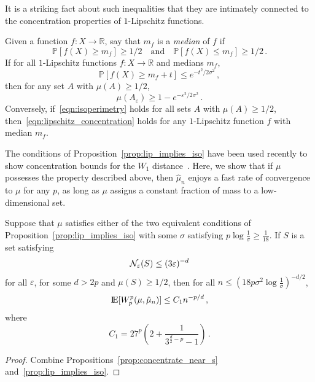 \documentclass[sts]{imsart}
\newcommand{\RR}{\mathbb{R}}
\newcommand{\p}{\mathbb{P}}
\newcommand*{\ep}{\varepsilon}
\begin{document}
It is a striking fact about such inequalities that they are intimately connected to the concentration properties of $1$-Lipschitz functions.
\begin{proposition}\label{prop:lip_implies_iso}
Given a function $f:X \to \RR$, say that $m_f$ is a \emph{median} of $f$ if
\begin{equation*}
\p[f(X) \geq m_f] \geq 1/2 \quad \text{and} \quad \p[f(X) \leq m_f] \geq 1/2\,.
\end{equation*}
If for all $1$-Lipschitz functions $f: X \to \RR$ and medians $m_f$,
\begin{equation}\label{eqn:lipschitz_concentration}
\p[f(X) \geq m_f + t] \leq e^{-t^2/2\sigma^2}\,,
\end{equation}
then for any set $A$ with $\mu(A) \geq 1/2$,
\begin{equation}\label{eqn:isoperimetry}
\mu(A_\ep) \geq 1 - e^{-\ep^2/2 \sigma^2}\,.
\end{equation}
Conversely, if~\eqref{eqn:isoperimetry} holds for all sets $A$ with $\mu(A) \geq 1/2$, then~\eqref{eqn:lipschitz_concentration} holds for any $1$-Lipschitz function $f$ with median $m_f$.
\end{proposition}

The conditions of Proposition~\ref{prop:lip_implies_iso} have been used recently to show concentration bounds for the $W_1$ distance~\cite{BolGuiVil07}.
Here, we show that if $\mu$ possesses the property described above, then $\hat \mu_n$ enjoys a fast rate of convergence to $\mu$ for any $p$, as long as $\mu$ assigns a constant fraction of mass to a low-dimensional set.

\begin{proposition}
Suppose that $\mu$ satisfies either of the two equivalent conditions of Proposition~\ref{prop:lip_implies_iso} with some $\sigma$ satisfying $p \log \frac 1 \sigma \geq \frac{1}{18}$.
If $S$ is a set satisfying
\begin{equation*}
\cN_{\ep}(S) \leq (3 \ep)^{-d}
\end{equation*}
for all $\ep$, for some $d > 2p$ and $\mu(S) \geq 1/2$, then for all $n \leq \left(18p \sigma^2 \log \frac 1 \sigma\right)^{-d/2}$,
\begin{equation*}
{\rm I}\kern-0.18em{\rm E}[W_p^p(\mu, \hat \mu_n)] \leq C_1 n^{-p/d}\,,
\end{equation*}
where
\begin{equation*}
C_1 = 27^p\left(2+\frac{1}{3^{\frac{d}{2} - p} -1}\right)\,.
\end{equation*}
\end{proposition}
\begin{proof}
Combine Propositions~\ref{prop:concentrate_near_s} and~\ref{prop:lip_implies_iso}.
\end{proof}
\end{document}
